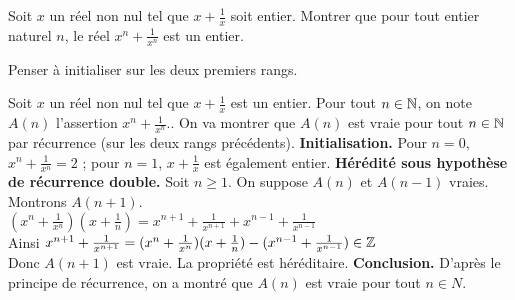 \begin{exo}
Soit $x$ un réel non nul tel que $x+\frac1x$ soit entier. Montrer que pour tout entier naturel $n$, le réel $x^n+\frac{1}{x^n}$ est un entier.
\begin{hint}
Penser à initialiser sur les deux premiers rangs.
\end{hint}
\begin{sol}
Soit $x$ un réel non nul tel que $x + \frac{1}{x}$ est un entier. Pour tout $n \in \mathbb N$, on note $A(n)$ l'assertion \og $x^n + \frac{1}{x^n}$.\fg. On va montrer que $A(n)$ est vraie pour tout $n \in \mathbb N$ par récurrence (sur les deux rangs précédents).
\textbf{Initialisation.} Pour $n = 0$, $x^n + \frac{1}{x^n} = 2$ ; pour $n = 1$, $x + \frac{1}{x}$ est également entier.
\textbf{Hérédité sous hypothèse de récurrence double.} Soit $n \geq 1$. On suppose $A(n)$ et $A(n-1)$ vraies. Montrons $A(n+1)$. \\
$(x^n + \frac{1}{x^n})(x+\frac{1}{n}) = x^{n+1} + \frac{1}{x^{n+1}} + x^{n-1} + \frac{1}{x^{n-1}}$\\
Ainsi $x^{n+1} + \frac{1}{x^{n+1}} = (x^n + \frac{1}{x^n})(x+\frac{1}{n}) - (x^{n-1} + \frac{1}{x^{n-1}}) \in \mathbb Z$\\
Donc $A(n+1)$ est vraie. La propriété est héréditaire.
\textbf{Conclusion.} D'après le principe de récurrence, on a montré que $A(n)$ est vraie pour tout $n \in N$.\\
\end{sol}

\end{exo}


